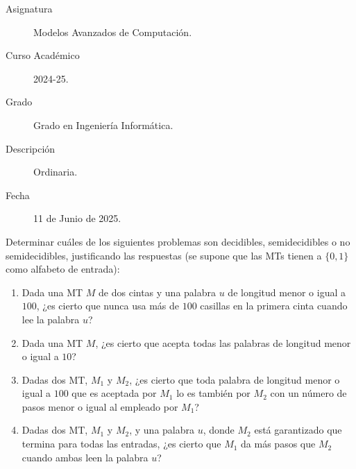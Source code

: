 \documentclass[12pt]{article}
\begin{document}

    
    

    \begin{description}
        \item[Asignatura] Modelos Avanzados de Computación.
        \item[Curso Académico] 2024-25.
        \item[Grado] Grado en Ingeniería Informática.
        \item[Descripción] Ordinaria.
        \item[Fecha] 11 de Junio de 2025.  
    \end{description}
    \newpage



    \begin{ejercicio}[2.4 puntos]
        Determinar cuáles de los siguientes problemas son decidibles, semidecidibles o no semidecidibles, justificando las respuestas (se supone que las MTs tienen a $\{0,1\}$ como alfabeto de entrada):

        \begin{enumerate}
            \item Dada una MT $M$ de dos cintas y una palabra $u$ de longitud menor o igual a $100$, ¿es cierto que nunca usa más de $100$ casillas en la primera cinta cuando lee la palabra $u$?

            \item Dada una MT $M$, ¿es cierto que acepta todas las palabras de longitud menor o igual a $10$?

            \item Dadas dos MT, $M_1$ y $M_2$, ¿es cierto que toda palabra de longitud menor o igual a $100$ que es aceptada por $M_1$ lo es también por $M_2$ con un número de pasos menor o igual al empleado por $M_1$?

            \item Dadas dos MT, $M_1$ y $M_2$, y una palabra $u$, donde $M_2$ está garantizado que termina para todas las entradas, ¿es cierto que $M_1$ da más pasos que $M_2$ cuando ambas leen la palabra $u$?
        \end{enumerate}
    \end{ejercicio}
\end{document}
